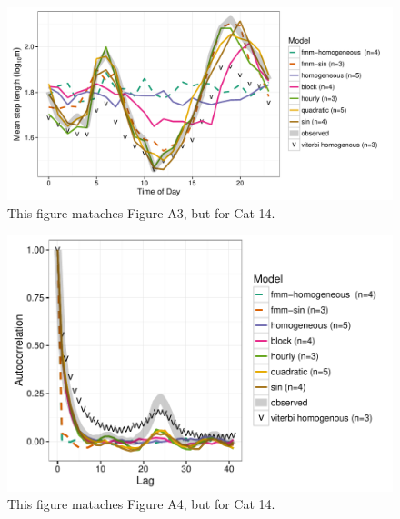 \documentclass{article}\usepackage[]{graphicx}\usepackage{xcolor}
\makeatletter
\def\maxwidth{ %
  \ifdim\Gin@nat@width>\linewidth
    \linewidth
  \else
    \Gin@nat@width
  \fi
}
\newenvironment{knitrout}{}{} %
\makeatother
\begin{document}
\clearpage

\begin{knitrout}
\color{fgcolor}\begin{figure}
\includegraphics[width=\maxwidth]{figure/avg_step_length_by_time14-1} \caption{This figure mataches Figure A3, but for Cat 14.}\label{fig:avg_step_length_by_time14}
\end{figure}


\end{knitrout}

\clearpage

\begin{knitrout}
\color{fgcolor}\begin{figure}
\includegraphics[width=\maxwidth]{figure/acf_plot14-1} \caption{This figure mataches Figure A4, but for Cat 14.}\label{fig:acf_plot14}
\end{figure}


\end{knitrout}
\end{document}
